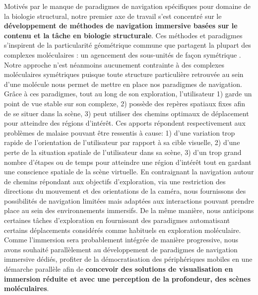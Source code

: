 Motivés par le manque de paradigmes de navigation spécifiques pour domaine de la biologie structural, notre premier axe de travail s'est concentré sur le \textbf{développement de méthodes de navigation immersive basées sur le contenu et la tâche en biologie structurale}. Ces méthodes et paradigmes s'inspirent de la particularité géométrique commune que partagent la plupart des complexes moléculaires : un agencement des sous-unités de façon symétrique \cite{goodsell_structural_2000}. Notre approche n'est néanmoins aucunement contrainte à des complexes moléculaires symétriques puisque toute structure particulière retrouvée au sein d'une molécule nous permet de mettre en place nos paradigmes de navigation. Grâce à ces paradigmes, tout au long de son exploration, l'utilisateur 1) garde un point de vue stable sur son complexe, 2) possède des repères spatiaux fixes afin de se situer dans la scène, 3) peut utiliser des chemins optimaux de déplacement pour atteindre des régions d’intérêt. Ces apports répondent respectivement aux problèmes de malaise pouvant être ressentis à cause: 1) d'une variation trop rapide de l'orientation de l'utilisateur par rapport à sa cible visuelle, 2) d'une perte de la situation spatiale de l'utilisateur dans sa scène, 3) d'un trop grand nombre d'étapes ou de temps pour atteindre une région d'intérêt tout en gardant une conscience spatiale de la scène virtuelle. En contraignant la navigation autour de chemins répondant aux objectifs d'exploration, via une restriction des directions du mouvement et des orientations de la caméra, nous fournissons des possibilités de navigation limitées mais adaptées aux interactions pouvant prendre place au sein des environnements immersifs. De la même manière, nous anticipons certaines tâches d'exploration en fournissant des paradigmes automatisant certains déplacements considérés comme habituels en exploration moléculaire. Comme l'immersion sera probablement intégrée de manière progressive, nous avons souhaité parallèlement au développement de paradigmes de navigation immersive dédiés, profiter de la démocratisation des périphériques mobiles en une démarche parallèle afin de \textbf{concevoir des solutions de visualisation en immersion réduite et avec une perception de la profondeur, des scènes moléculaires}. 





